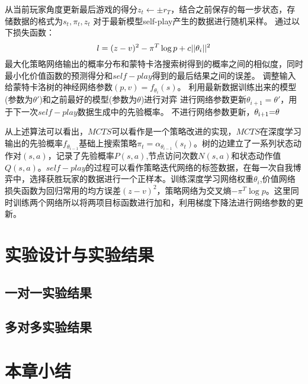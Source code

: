\begin{algorithm}[!hbp]
\begin{algorithmic}[1]
		\State 从当前玩家角度更新最后游戏的得分${z_t} \leftarrow  \pm {r_T}$，结合之前保存的每一步状态，存储数据的格式为$s_t,\pi_t,z_t$
		\EndFor
		\State 对于最新模型self-play产生的数据进行随机采样。
		\State 通过以下损失函数：
		\begin{equation}
		l = {(z - v)^2} - {\pi ^T}\log p + c||{\theta _i}{\rm{|}}{{\rm{|}}^{\rm{2}}}
		\end{equation}
		最大化策略网络输出的概率分布和蒙特卡洛搜索树得到的概率之间的相似度，同时最小化价值函数的预测得分和$self-play$得到的最后结果之间的误差。
		调整输入给蒙特卡洛树的神经网络参数$(p,v) = {f_{{\theta _i}}}(s)$。
		\State 利用最新数据训练出来的模型(参数为$\theta '$)和之前最好的模型(参数为$\theta$)进行对弈
		 \State 进行网络参数更新${\theta _{i + 1}} = \theta '$，用于下一次$self-play$数据生成中的先验概率。
		\Else
		 \State 不进行网络参数更新，${\theta _{{\rm{i + 1}}}}{\rm{ = }}\theta $
		\EndIf
		\EndIf
		\EndFor
	\end{algorithmic}
\end{algorithm}

从上述算法可以看出，$MCTS$可以看作是一个策略改进的实现，$MCTS$在深度学习输出的先验概率${f_{{\theta _{i - 1}}}}$基础上搜索策略${\pi _t} = {\alpha _{{\theta _{i - 1}}}}({s_t})$。树的边建立了一系列状态动作对$(s,a)$，记录了先验概率$P(s,a)$,节点访问次数$N(s,a)$和状态动作值$Q(s,a)$。$self-play$的过程可以看作策略迭代网络的标签数据，在每一次自我博弈中，选择获胜玩家的数据进行一个正样本。训练深度学习网络权重${\theta _i}$,价值网络损失函数为回归常用的均方误差${(z - v)^2}$，策略网络为交叉熵$ - {\pi ^T}\log p$。这里同时训练两个网络所以将两项目标函数进行加和，利用梯度下降法进行网络参数的更新。


\section{实验设计与实验结果}
\subsection{一对一实验结果}
\subsection{多对多实验结果}
\section{本章小结}


